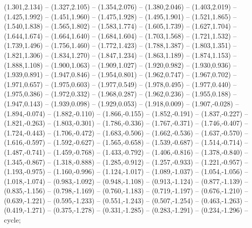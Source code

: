 (1.301,2.134) -- (1.327,2.105) -- (1.354,2.076) -- (1.380,2.046) -- (1.403,2.019) -- (1.425,1.992) -- (1.451,1.960) -- (1.475,1.928) -- (1.495,1.901) -- (1.521,1.865) -- (1.540,1.838) -- (1.565,1.802) -- (1.583,1.774) -- (1.605,1.739) -- (1.627,1.704) -- (1.644,1.674) -- (1.664,1.640) -- (1.684,1.604) -- (1.703,1.568) -- (1.721,1.532) -- (1.739,1.496) -- (1.756,1.460) -- (1.772,1.423) -- (1.788,1.387) -- (1.803,1.351) -- (1.821,1.306) -- (1.834,1.270) -- (1.847,1.234) -- (1.863,1.189) -- (1.874,1.153) -- (1.888,1.108) -- (1.900,1.063) -- (1.909,1.027) -- (1.920,0.982) -- (1.930,0.936) -- (1.939,0.891) -- (1.947,0.846) -- (1.954,0.801) -- (1.962,0.747) -- (1.967,0.702) -- (1.971,0.657) -- (1.975,0.603) -- (1.977,0.549) -- (1.978,0.495) -- (1.977,0.440) -- (1.975,0.386) -- (1.972,0.332) -- (1.968,0.287) -- (1.962,0.236) -- (1.955,0.188) -- (1.947,0.143) -- (1.939,0.098) -- (1.929,0.053) -- (1.918,0.009) -- (1.907,-0.028) -- (1.894,-0.074) -- (1.882,-0.110) -- (1.866,-0.155) -- (1.852,-0.191) -- (1.837,-0.227) -- (1.821,-0.263) -- (1.803,-0.301) -- (1.786,-0.336) -- (1.767,-0.371) -- (1.746,-0.407) -- (1.724,-0.443) -- (1.706,-0.472) -- (1.683,-0.506) -- (1.662,-0.536) -- (1.637,-0.570) -- (1.616,-0.597) -- (1.592,-0.627) -- (1.565,-0.658) -- (1.539,-0.687) -- (1.514,-0.714) -- (1.487,-0.741) -- (1.459,-0.768) -- (1.433,-0.792) -- (1.406,-0.816) -- (1.378,-0.840) -- (1.345,-0.867) -- (1.318,-0.888) -- (1.285,-0.912) -- (1.257,-0.933) -- (1.221,-0.957) -- (1.193,-0.975) -- (1.160,-0.996) -- (1.124,-1.017) -- (1.089,-1.037) -- (1.054,-1.056) -- (1.018,-1.074) -- (0.983,-1.092) -- (0.948,-1.108) -- (0.913,-1.124) -- (0.877,-1.139) -- (0.835,-1.156) -- (0.798,-1.169) -- (0.760,-1.183) -- (0.719,-1.197) -- (0.676,-1.210) -- (0.639,-1.221) -- (0.595,-1.233) -- (0.551,-1.243) -- (0.507,-1.254) -- (0.463,-1.263) -- (0.419,-1.271) -- (0.375,-1.278) -- (0.331,-1.285) -- (0.283,-1.291) -- (0.234,-1.296) -- cycle;
